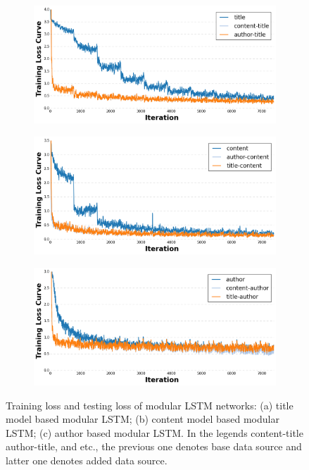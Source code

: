 \documentclass[12pt]{article}
\begin{document}
\begin{figure}[!t]
\begin{subfigure}{1\textwidth}
  \centering
   \includegraphics[width=4in]{figures/loss_training_title_modular.png}
   \caption{}
   \label{modular_loss_title}
\end{subfigure}

\begin{subfigure}{1\textwidth}
  \centering
   \includegraphics[width=4in]{figures/loss_training_content_modular.png}
   \caption{}
   \label{modular_loss_title}
\end{subfigure}

\begin{subfigure}{1\textwidth}
  \centering
   \includegraphics[width=4in]{figures/loss_training_author_modular.png}
   \caption{}
   \label{modular_loss_title}
\end{subfigure}

\caption{Training loss and testing loss of modular LSTM networks: (a) title model based modular LSTM; (b) content model based modular LSTM; (c) author based modular LSTM. In the legends content-title author-title, and etc., the previous one denotes base data source and latter one denotes added data source.}
\label{modular_loss}
\end{figure}
   
\end{document}
